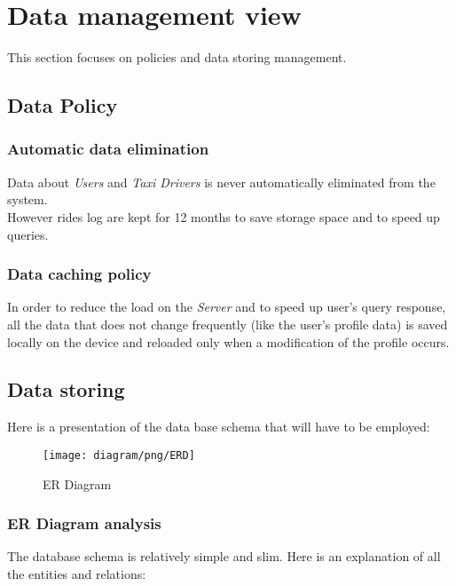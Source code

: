 \section{Data management view} %
\label{sec:data_management}
This section focuses on policies and data storing management.\\
\subsection{Data Policy} %
\label{sub:data_policy}
\subsubsection{Automatic data elimination} %
\label{ssub:data_elimination}
Data about \emph{Users} and \emph{Taxi Drivers} is never automatically eliminated from the system.\\
However rides log are kept for 12 months to save storage space and to speed up queries.
\subsubsection{Data caching policy} %
\label{ssub:data_caching}
In order to reduce the load on the \emph{Server} and to speed up user's query response, all the data that does not change frequently (like the user's profile data) is saved locally on the device and reloaded only when a modification of the profile occurs.

\subsection{Data storing} %
Here is a presentation of the data base schema that will have to be employed:
\newpage
\label{sub:data_storing}
\begin{figure}[h!t]
\caption{ER Diagram}
\texttt{[image: diagram/png/ERD]}
\centering
\end{figure}
\newpage

\subsubsection{ER Diagram analysis} %
\label{ssub:er_diagram_analysis}

The database schema is relatively simple and slim.
Here is an explanation of all the entities and relations:


